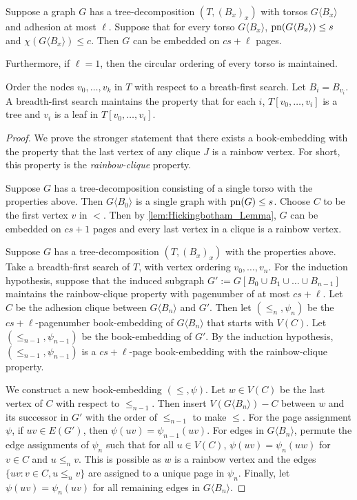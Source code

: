\begin{theorem}
	Suppose a graph \(G\) has a tree-decomposition \((T, (B_x)_x)\) with torsos \(G \langle B_x \rangle\) and adhesion at most \(\ell\). Suppose that for every torso $G\langle B_x \rangle$, \(\operatorname{pn}(G\langle B_x \rangle) \leq s\) and \(\chi(G\langle B_x \rangle) \leq c\). Then \(G\) can be embedded on \(cs + \ell\) pages.

	Furthermore, if $\ell = 1$, then the circular ordering of every torso is maintained.
\end{theorem}
Order the nodes \(v_0, \ldots, v_k\) in $T$ with respect to a breath-first search. Let $B_i = B_{v_i}$. 
A breadth-first search maintains the property that for each \(i\), \(T[v_0, \ldots, v_{i}]\) is a tree and \(v_i\) is a leaf in \(T[v_0, \ldots, v_{i}]\).
\begin{proof}
	We prove the stronger statement that there exists a book-embedding with the property that the last vertex of any clique \(J\) is a rainbow vertex. For short, this property is the \textit{rainbow-clique} property. 

	Suppose $G$ has a tree-decomposition consisting of a single torso with the properties above. Then \(G\langle B_0 \rangle\) is a single graph with \(\operatorname{pn}(G) \leq s\). Choose \(C\) to be the first vertex \(v\) in \( < \). Then by \cref{lem:Hickingbotham_Lemma}, $G$ can be embedded on \(cs + 1\) pages and every last vertex in a clique is a rainbow vertex.

	Suppose $G$ has a tree-decomposition $(T, (B_x)_x)$ with the properties above. Take a breadth-first search of $T$, with vertex ordering $v_0, \ldots, v_n$. For the induction hypothesis, suppose that the induced subgraph $G' := G[B_0 \cup B_1 \cup \ldots \cup B_{n-1}]$ maintains the rainbow-clique property with pagenumber of at most \(cs + \ell\).  
	Let \(C\) be the adhesion clique between \(G \langle B_n \rangle\) and $G'$. Then let \((\leq_n, \psi_n)\) be the \(cs + \ell\)-pagenumber book-embedding of \(G \langle B_n \rangle\) that starts with \(V(C)\). Let \((\leq_{n-1}, \psi_{n-1})\) be the book-embedding of \(G'\). By the induction hypothesis, \((\leq_{n-1}, \psi_{n-1})\) is a \(cs + \ell\)-page book-embedding with the rainbow-clique property.

	We construct a new book-embedding \((\leq, \psi)\).
	Let \(w \in V(C)\) be the last vertex of \(C\) with respect to \(\leq_{n-1}\). Then insert \(V(G \langle B_n \rangle) - C\) between \(w\) and its successor in $G'$ with the order of \(\leq_{n-1}\) to make $\leq$. For the page assignment \(\psi\), if \(uv \in E(G')\), then \(\psi(uv) = \psi_{n-1}(uv)\). For edges in $G \langle B_n \rangle$, permute the edge assignments of \(\psi_n\) such that for all \(u \in V(C)\), \(\psi(uv) = \psi_n(uw)\) for $v \in C$ and $u \leq_n v$. This is possible as \(w\) is a rainbow vertex and the edges \(\{uv : v \in C, u \leq_n v\}\) are assigned to a unique page in \(\psi_n\). Finally, let \(\psi(uv) = \psi_n(uv)\) for all remaining edges in $G \langle B_n \rangle$. 


\end{proof}
